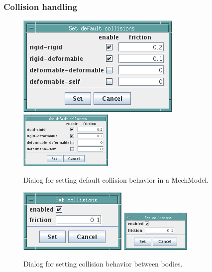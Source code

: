 \documentclass{article}
\begin{document}
\subsubsection{Collision handling}

\begin{figure}[h]
\begin{center}
\iflatexml
\includegraphics[]{images/setDefaultCollisionsDialog}
\else
\includegraphics[width=0.40\textwidth]{images/setDefaultCollisionsDialog}
\fi
\end{center}
\caption{Dialog for setting default collision behavior in a MechModel.}%
\label{setDefaultCollisionsDialogFig}
\end{figure}

\begin{figure}[h]
\begin{center}
\iflatexml
\includegraphics[]{images/setCollisionsDialog}
\else
\includegraphics[width=0.30\textwidth]{images/setCollisionsDialog}
\fi
\end{center}
\caption{Dialog for setting collision behavior between bodies.}%
\label{setCollisionsDialogFig}
\end{figure}
\end{document}
